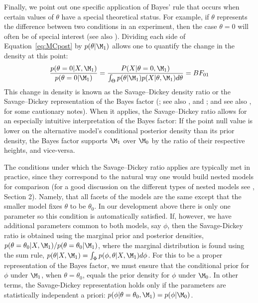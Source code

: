 Finally, we point out one specific application of Bayes' rule that occurs when certain values of $\theta$ have a special theoretical status. For example, if $\theta$ represents the difference between two conditions in an experiment, then the case $\theta=0$ will often be of special interest (see also ). Dividing each side of Equation~\ref{eq:MCpost} by $p(\theta|\M_1)$ allows one to quantify the change in the density at this point: 
$$ \frac{p(\theta=0|X,\M_1)}{p(\theta=0|\M_1)} = 
\frac{P(X|\theta=0,\M_1)}{\int_\Theta p(\theta|\M_1)p(X|\theta,\M_1)d\theta} = BF_{01}
$$ 
This change in density is known as the Savage--Dickey density ratio or the Savage--Dickey representation of the Bayes factor (; see also , and ; and see also , for some cautionary notes). When it applies, the Savage--Dickey ratio allows for an especially intuitive interpretation of the Bayes factor: If the point null value is lower on the alternative model's conditional posterior density than its prior density, the Bayes factor supports $\M_1$ over $\M_0$ by the ratio of their respective heights, and vice-versa. 

{The conditions under which the Savage--Dickey ratio applies are typically met in practice, since they correspond to the natural way one would build nested models for comparison {(for a good discussion on the different types of nested models see , Section 2)}. Namely, that all facets of the models are the same except that the smaller model fixes $\theta$ to be $\theta_0$. In our development above there is only one parameter so this condition is automatically satisfied. If, however, we have additional parameters common to both models, say $\phi$, then the Savage-Dickey ratio is obtained using the marginal prior and posterior densities, $p(\theta=\theta_0|X,\M_1)/p(\theta=\theta_0|\M_1)$, where the marginal distribution is found using the sum rule, $p(\theta|X,\M_1)=\int_\Phi p(\phi,\theta|X,\M_1)d\phi$. For this to be a proper representation of the Bayes factor, we must ensure that the conditional prior for $\phi$ under $\M_1$, when $\theta=\theta_0$, equals the prior density for $\phi$ under $\M_0$. In other terms, the Savage-Dickey representation holds only if the parameters are statistically independent a priori: $p(\phi|\theta=\theta_0,\M_1) = p(\phi|\M_0)$.}


